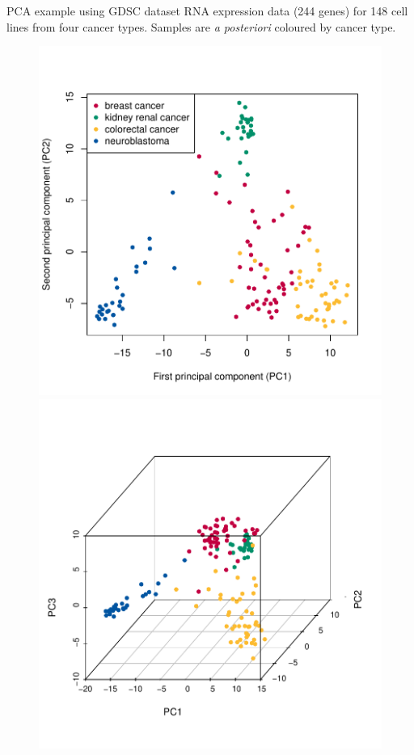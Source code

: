 \documentclass[notes]{beamer}          %
\begin{document}
\begin{frame}{PCA example using GDSC dataset}
RNA expression data (244 genes) for 148 cell lines from four cancer types. Samples are \textit{a posteriori}  coloured by cancer type.
\begin{figure}
  \includegraphics[width=\linewidth]{../figures/week_6/GDSC_2D_PC.pdf}  
\endminipage\hfill
{}
  \includegraphics[width=\linewidth]{../figures/week_6/GDSC_3D_PC.pdf}  
\endminipage\hfill
\end{figure}
\end{frame}
\end{document}
